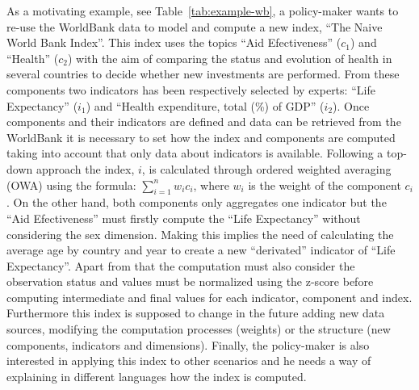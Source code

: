 \documentclass{llncs}
\begin{document}



As a motivating example, see Table~\ref{tab:example-wb}, a policy-maker wants to re-use the WorldBank data to model and compute a new index, ``The Naive World Bank Index''. This 
index uses the topics ``Aid Efectiveness'' ($c_1$) and ``Health'' ($c_2$) with the aim of comparing the status and evolution of health in several countries to decide whether new 
investments are performed. From these components two indicators has been respectively selected by experts: ``Life Expectancy'' ($i_1$) and ``Health expenditure, total (\%) of GDP'' ($i_2$). 
Once components and their indicators are defined and data can be retrieved from the WorldBank it is necessary to set how the index and components are computed 
taking into account that only data about indicators is available. Following a top-down approach the index, $i$, is calculated through ordered weighted averaging (OWA) using the 
formula: $\sum_{i=1}^n  w_i c_i$, where $w_i$ is the weight of the component $c_i$. On the other hand, both components only aggregates one indicator but the ``Aid Efectiveness'' 
must firstly compute the ``Life Expectancy'' without considering the sex dimension. Making this implies the need of calculating the average age by country and year to create 
a new ``derivated'' indicator of ``Life Expectancy''. Apart from that the computation must also consider the observation status and values must be normalized using the 
z-score before computing intermediate and final values for each indicator, component and index. Furthermore this index is supposed to change in the future 
adding new data sources, modifying the computation processes (weights) or the structure (new components, indicators and dimensions). Finally, the policy-maker 
is also interested in applying this index to other scenarios and he needs a way of explaining in different languages how the index is computed. 
\end{document}
